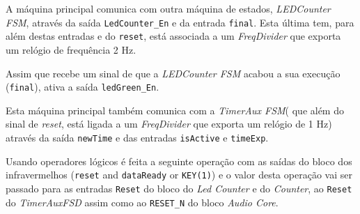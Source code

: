 \documentclass[a4paper,11pt,onecolumn]{report}
\begin{document}
A máquina principal comunica com outra máquina de estados, \textit{LEDCounter FSM}, através da saída \texttt{LedCounter\_En} e da entrada \texttt{final}. Esta última tem, para além destas entradas e do \texttt{reset}, está associada a um \textit{FreqDivider} que exporta um relógio de frequência 2 Hz.

Assim que recebe um sinal de que a \textit{LEDCounter FSM} acabou a sua execução (\texttt{final}), ativa a saída \texttt{ledGreen\_En}.

Esta máquina principal também comunica com a \textit{TimerAux FSM}( que além do sinal de \textit{reset}, está ligada a um \textit{FreqDivider} que exporta um relógio de 1 Hz) através da saída \texttt{newTime} e das entradas \texttt{isActive} e \texttt{timeExp}.

Usando operadores lógicos é feita a seguinte operação com as saídas do bloco dos infravermelhos (\texttt{reset} and \texttt{dataReady} or \texttt{KEY(1)}) e o valor desta operação vai ser passado para as entradas \texttt{Reset} do bloco do \textit{Led Counter} e do \textit{Counter}, ao \texttt{Reset} do \textit{TimerAuxFSD} assim como ao \texttt{RESET\_N} do bloco \textit{Audio Core}. 
\end{document}
